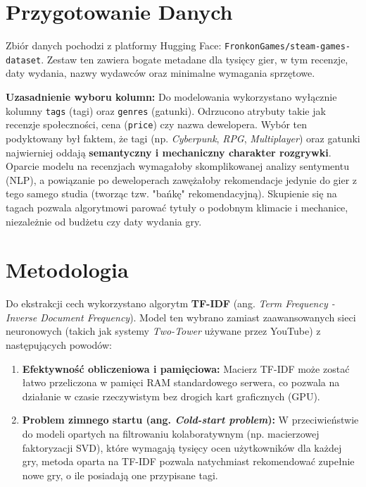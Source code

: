 \documentclass[12pt,a4paper]{article}
\begin{document}
\section{Przygotowanie Danych}
Zbiór danych pochodzi z platformy Hugging Face: \texttt{FronkonGames/steam-games-dataset}. Zestaw ten zawiera bogate metadane dla tysięcy gier, w tym recenzje, daty wydania, nazwy wydawców oraz minimalne wymagania sprzętowe.

\textbf{Uzasadnienie wyboru kolumn:} Do modelowania wykorzystano wyłącznie kolumny \texttt{tags} (tagi) oraz \texttt{genres} (gatunki). Odrzucono atrybuty takie jak recenzje społeczności, cena (\texttt{price}) czy nazwa dewelopera. Wybór ten podyktowany był faktem, że tagi (np. \textit{Cyberpunk}, \textit{RPG}, \textit{Multiplayer}) oraz gatunki najwierniej oddają \textbf{semantyczny i mechaniczny charakter rozgrywki}. Oparcie modelu na recenzjach wymagałoby skomplikowanej analizy sentymentu (NLP), a powiązanie po deweloperach zawężałoby rekomendacje jedynie do gier z tego samego studia (tworząc tzw. "bańkę" rekomendacyjną). Skupienie się na tagach pozwala algorytmowi parować tytuły o podobnym klimacie i mechanice, niezależnie od budżetu czy daty wydania gry.

\section{Metodologia}

Do ekstrakcji cech wykorzystano algorytm \textbf{TF-IDF} (ang. \textit{Term Frequency - Inverse Document Frequency}). Model ten wybrano zamiast zaawansowanych sieci neuronowych (takich jak systemy \textit{Two-Tower} używane przez YouTube) z następujących powodów:
\begin{enumerate}
    \item \textbf{Efektywność obliczeniowa i pamięciowa:} Macierz TF-IDF może zostać łatwo przeliczona w pamięci RAM standardowego serwera, co pozwala na działanie w czasie rzeczywistym bez drogich kart graficznych (GPU).
    \item \textbf{Problem zimnego startu (ang. \textit{Cold-start problem}):} W przeciwieństwie do modeli opartych na filtrowaniu kolaboratywnym (np. macierzowej faktoryzacji SVD), które wymagają tysięcy ocen użytkowników dla każdej gry, metoda oparta na TF-IDF pozwala natychmiast rekomendować zupełnie nowe gry, o ile posiadają one przypisane tagi.
\end{enumerate}
\end{document}
